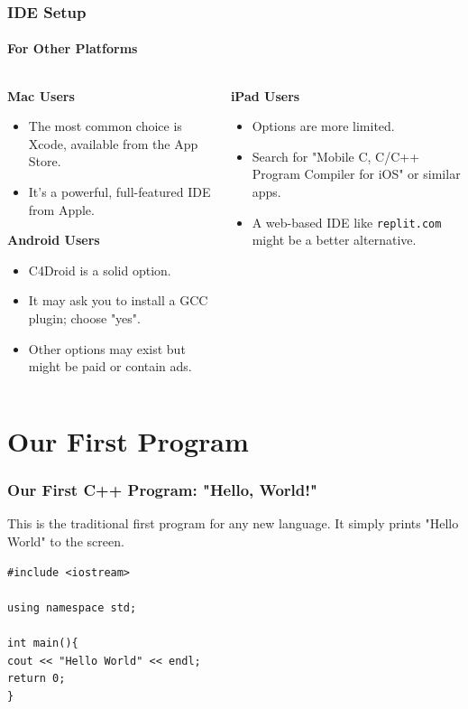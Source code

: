 \documentclass{beamer}
\begin{document}
\begin{frame}
\frametitle{IDE Setup}
\framesubtitle{For Other Platforms}
\begin{columns}[T]
\begin{column}{0.5\textwidth}
\textbf{Mac Users}
\begin{itemize}
\item The most common choice is \alert{Xcode}, available from the App Store.
\item It's a powerful, full-featured IDE from Apple.
\end{itemize}
\pause
\textbf{Android Users}
\begin{itemize}
\item \alert{C4Droid} is a solid option.
\item It may ask you to install a GCC plugin; choose "yes".
\item Other options may exist but might be paid or contain ads.
\end{itemize}
\end{column}
\begin{column}{0.5\textwidth}
\textbf{iPad Users}
\begin{itemize}
\item Options are more limited.
\item Search for "Mobile C, C/C++ Program Compiler for iOS" or similar apps.
\item A web-based IDE like \texttt{replit.com} might be a better alternative.
\end{itemize}
\end{column}
\end{columns}
\end{frame}

\section{Our First Program}

\begin{frame}[fragile]
\frametitle{Our First C++ Program: "Hello, World!"}
This is the traditional first program for any new language. It simply prints "Hello World" to the screen.

\begin{lstlisting}
#include <iostream>

using namespace std;

int main(){
cout << "Hello World" << endl;
return 0;
}
\end{lstlisting}
\end{frame}
\end{document}
